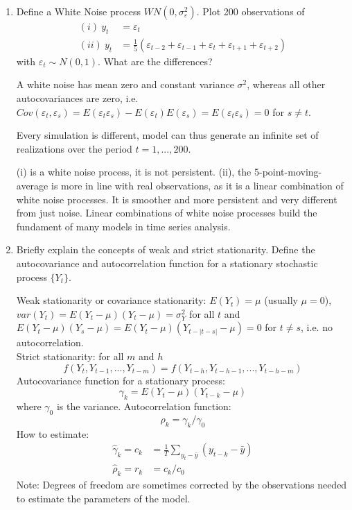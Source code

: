\documentclass[a4paper]{scrartcl}
\begin{document}
\begin{enumerate}
	\item Define a White Noise process $WN(0,\sigma_\varepsilon^2)$. Plot 200 observations of 
	\begin{align*} (i)~y_t&=\varepsilon_t\\ (ii)~y_t &= \frac{1}{5}(\varepsilon_{t-2}+\varepsilon_{t-1}+\varepsilon_{t}+\varepsilon_{t+1}+\varepsilon_{t+2})
	\end{align*} with $\varepsilon_{t} \sim N(0,1)$. What are the differences?
	\begin{solution}
		A white noise has mean zero and constant variance $\sigma^2$, whereas all other autocovariances are zero, i.e. $Cov(\varepsilon_{t},\varepsilon_s) = E(\varepsilon_t \varepsilon_s) - E(\varepsilon_t)E(\varepsilon_s) = E(\varepsilon_t \varepsilon_s) = 0$ for $s \neq t$.		
		
		Every simulation is different, model can thus generate an infinite set of realizations over the period $t=1,...,200$. 
		
		(i) is a white noise process, it is not persistent.		
		(ii), the 5-point-moving-average is more in line with real observations, as it is a linear combination of white noise processes. It is smoother and more persistent and very different from just noise. Linear combinations of white noise processes build the fundament of many models in time series analysis.
	\end{solution}

	\item Briefly explain the concepts of weak and strict stationarity. Define the autocovariance and autocorrelation function for a stationary stochastic process $\{Y_t\}$.
	\begin{solution}
	Weak stationarity or covariance stationarity: $E(Y_t)=\mu$ (usually $\mu=0$), $var(Y_t)=E(Y_t - \mu)(Y_t-\mu)=\sigma_Y^2$ for all $t$ and $E(Y_t-\mu)(Y_s-\mu)=E(Y_t-\mu)(Y_{t-|t-s|}-\mu)=0$ for $t\neq s$, i.e. no autocorrelation.\\
	Strict stationarity: for all $m$ and $h$ $$f(Y_t,Y_{t-1},...,Y_{t-m})=f(Y_{t-h},Y_{t-h-1},...,Y_{t-h-m})$$
	Autocovariance function for a stationary process: $$\gamma_k = E(Y_t - \mu)(Y_{t-k}-\mu)$$ where $\gamma_0$ is the variance. Autocorrelation function: $$\rho_k = \gamma_k/\gamma_0$$ How to estimate:
	\begin{align*}
	\hat{\gamma}_k = c_k &= \frac{1}{T} \sum_{y_t -\bar{y}}(y_{t-k}-\bar{y})\\
	\hat{\rho}_k = r_k & = c_k/c_0
	\end{align*}
	Note: Degrees of freedom are sometimes corrected by the observations needed to estimate the parameters of the model.
	\end{solution}
	

\end{enumerate}
\end{document}
